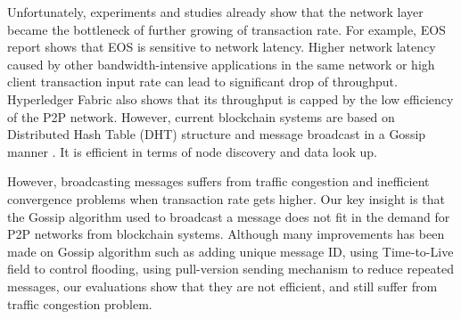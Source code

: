Unfortunately, experiments and studies \cite{cachin2016architecture, xueos} already show that the network layer became the bottleneck of further growing of transaction rate. For example, EOS report \cite{xueos} shows that EOS is sensitive to network latency. Higher network latency caused by other bandwidth-intensive applications in the same network or high client transaction input rate can lead to significant drop of throughput. Hyperledger Fabric \cite{cachin2016architecture} also shows that its throughput is capped by the low efficiency of the P2P network. However, current blockchain systems are based on Distributed Hash Table (DHT) structure and message broadcast in a Gossip manner \cite{eugster2004epidemic}. It is efficient in terms of node discovery and data look up. 

However, broadcasting messages suffers from traffic congestion and inefficient convergence problems when transaction rate gets higher. Our key insight is that the Gossip algorithm used to broadcast a message does not fit in the demand for P2P networks from blockchain systems. Although many improvements has been made on Gossip algorithm such as adding unique message ID, using Time-to-Live field to control flooding, using pull-version sending mechanism to reduce repeated messages, our evaluations show that they are not efficient, and still suffer from traffic congestion problem. 


